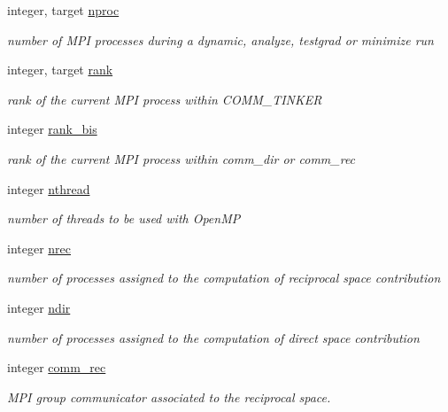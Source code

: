 \begin{DoxyCompactItemize}
integer, target \hyperlink{classdomdec_ad386ac278e357dd9bc1034b2b3cc04fc}{nproc}
\begin{DoxyCompactList}\small\item\em number of M\-P\-I processes during a dynamic, analyze, testgrad or minimize run \end{DoxyCompactList}\item 
integer, target \hyperlink{classdomdec_a146ec15c8422fd2670da75c3e0e0dfe9}{rank}
\begin{DoxyCompactList}\small\item\em rank of the current M\-P\-I process within C\-O\-M\-M\-\_\-\-T\-I\-N\-K\-E\-R \end{DoxyCompactList}\item 
integer \hyperlink{classdomdec_aebba4360c9e42de2ed494d4167a63a99}{rank\-\_\-bis}
\begin{DoxyCompactList}\small\item\em rank of the current M\-P\-I process within comm\-\_\-dir or comm\-\_\-rec \end{DoxyCompactList}\item 
integer \hyperlink{classdomdec_ad51e73bb1764f6f3e48bce4c4b6636ff}{nthread}
\begin{DoxyCompactList}\small\item\em number of threads to be used with Open\-M\-P \end{DoxyCompactList}\item 
integer \hyperlink{classdomdec_a70bead05b01696a0ee6be95ecd7fd9ea}{nrec}
\begin{DoxyCompactList}\small\item\em number of processes assigned to the computation of reciprocal space contribution \end{DoxyCompactList}\item 
integer \hyperlink{classdomdec_ae5edf3757894f9397d3d4f603eb2d076}{ndir}
\begin{DoxyCompactList}\small\item\em number of processes assigned to the computation of direct space contribution \end{DoxyCompactList}\item 
integer \hyperlink{classdomdec_a046ed439b4f62f80be0e38736896da25}{comm\-\_\-rec}
\begin{DoxyCompactList}\small\item\em M\-P\-I group communicator associated to the reciprocal space. \end{DoxyCompactList}\item 

\end{DoxyCompactItemize}

